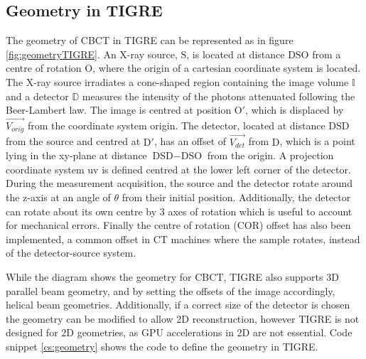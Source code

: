 \subsection{Geometry in TIGRE}

The geometry of CBCT in TIGRE can be represented as in figure \ref{fig:geometryTIGRE}. An X-ray source, $\text{S}$, is located at distance $\text{DSO}$ from a centre of rotation $\text{O}$, where the origin of a cartesian coordinate system is located. The X-ray source irradiates a cone-shaped region containing the image volume $\mathbb{I}$ and a detector $\mathbb{D}$ measures the intensity of the photons attenuated following the Beer-Lambert law. The image is centred at position $\text{O}'$, which is displaced by $\overrightarrow{V_{orig}}$ from the coordinate system origin. The detector, located at distance $\text{DSD}$ from the source and centred at $\text{D}'$, has an offset of $\overrightarrow{V_{det}}$ from $\text{D}$, which is a point lying in the xy-plane at distance $\text{DSD}-\text{DSO}$ from the origin. A projection coordinate system uv is defined centred at the lower left corner of the detector. During the measurement acquisition, the source and the detector rotate around the z-axis at an angle of $\theta$ from their initial position. Additionally, the detector can rotate about its own centre by 3 axes of rotation which is useful to account for mechanical errors\cite{yang2006geometric}. Finally the centre of rotation (COR) offset has also been implemented, a common offset in CT machines where the sample rotates, instead of the detector-source system.

While the diagram shows the geometry for CBCT, TIGRE also supports 3D parallel beam geometry, and by setting the offsets of the image accordingly, helical beam geometries. Additionally, if a correct size of the detector is chosen the geometry can be modified to allow 2D reconstruction, however TIGRE is not designed for 2D geometries, as GPU accelerations in 2D are not essential. Code snippet \ref{cs:geometry} shows the code to define the geometry in TIGRE.

